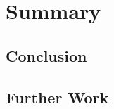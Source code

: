 \chapter{Summary} %
\label{chap:Summary}

\section{Conclusion} %
\label{sec:Conclusion}



\section{Further Work} %
\label{sec:Further Work}


